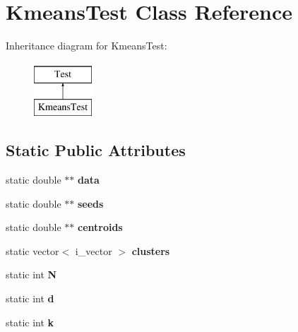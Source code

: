 \hypertarget{classKmeansTest}{\section{Kmeans\-Test Class Reference}
\label{classKmeansTest}
}
Inheritance diagram for Kmeans\-Test\-:\begin{figure}[H]
\begin{center}
\leavevmode
\includegraphics[height=2.000000cm]{classKmeansTest}
\end{center}
\end{figure}
\subsection*{Static Public Attributes}
\begin{DoxyCompactItemize}
\item 
\hypertarget{classKmeansTest_ac49bc85d7f0c6573fdb41291fcad7ea8}{static double $\ast$$\ast$ {\bfseries data}}\label{classKmeansTest_ac49bc85d7f0c6573fdb41291fcad7ea8}

\item 
\hypertarget{classKmeansTest_a02a49c0447e8979c5e42e80798f1909d}{static double $\ast$$\ast$ {\bfseries seeds}}\label{classKmeansTest_a02a49c0447e8979c5e42e80798f1909d}

\item 
\hypertarget{classKmeansTest_ad1d5e54851950f37170c362518fc5aef}{static double $\ast$$\ast$ {\bfseries centroids}}\label{classKmeansTest_ad1d5e54851950f37170c362518fc5aef}

\item 
\hypertarget{classKmeansTest_ab83157ed1cd9481c94b2b5272ca5020d}{static vector$<$ i\-\_\-vector $>$ {\bfseries clusters}}\label{classKmeansTest_ab83157ed1cd9481c94b2b5272ca5020d}

\item 
\hypertarget{classKmeansTest_a881736055281c3d2d5f161a57f37b810}{static int {\bfseries N}}\label{classKmeansTest_a881736055281c3d2d5f161a57f37b810}

\item 
\hypertarget{classKmeansTest_a08d592368c02b1aabe71c26b34796bf6}{static int {\bfseries d}}\label{classKmeansTest_a08d592368c02b1aabe71c26b34796bf6}

\item 
\hypertarget{classKmeansTest_a044e6c5eff9a1a3ddb542771c226bd7b}{static int {\bfseries k}}\label{classKmeansTest_a044e6c5eff9a1a3ddb542771c226bd7b}

\end{DoxyCompactItemize}
